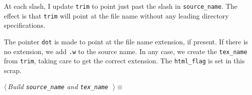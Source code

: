 \documentclass{report}
\begin{document}
At each slash, I update \verb|trim| to point just past the
slash in \verb|source_name|. The effect is that \verb|trim| will point
at the file name without any leading directory specifications.

The pointer \verb|dot| is made to point at the file name extension, if
present. If there is no extension, we add \verb|.w| to the source name.
In any case, we create the \verb|tex_name| from \verb|trim|, taking
care to get the correct extension.  The \verb|html_flag| is set in
this scrap.
\begin{flushleft} \small
\begin{minipage}{\linewidth} \label{scrap29}
$\langle\,${\it Build \verb|source_name| and \verb|tex_name|}\nobreak\ {\footnotesize {}}$\,\rangle\equiv$
\vspace{-1ex}
\begin{list}{}{} \item
\mbox{}\verb@{@\\
\mbox{}\verb@  char *p = argv[arg];@\\
\mbox{}\verb@  char *q = source_name;@\\
\mbox{}\verb@  char *trim = q;@\\
\mbox{}\verb@  char *dot = NULL;@\\
\mbox{}\verb@  char c = *p++;@\\
\mbox{}\verb@  while (c) {@\\
\mbox{}\verb@    *q++ = c;@\\
\mbox{}\verb@    if (PATH_SEP(c)) {@\\
\mbox{}\verb@      trim = q;@\\
\mbox{}\verb@      dot = NULL;@\\
\mbox{}\verb@    }@\\
\mbox{}\verb@    else if (c == '.')@\\
\mbox{}\verb@      dot = q - 1;@\\
\mbox{}\verb@    c = *p++;@\\
\mbox{}\verb@  }@\\
\mbox{}\verb@  *q = '\0';@\\
\mbox{}\verb@  if (dot) {@\\
\mbox{}\verb@    *dot = '\0'; /* produce HTML when the file extension is ".hw" */@\\
\mbox{}\verb@    html_flag = dot[1] == 'h' && dot[2] == 'w' && dot[3] == '\0';@\\
\mbox{}\verb@    sprintf(tex_name, "%s%s%s.tex", dirpath, path_sep, trim);@\\

\end{list}
\end{minipage}
\end{flushleft}
\end{document}
